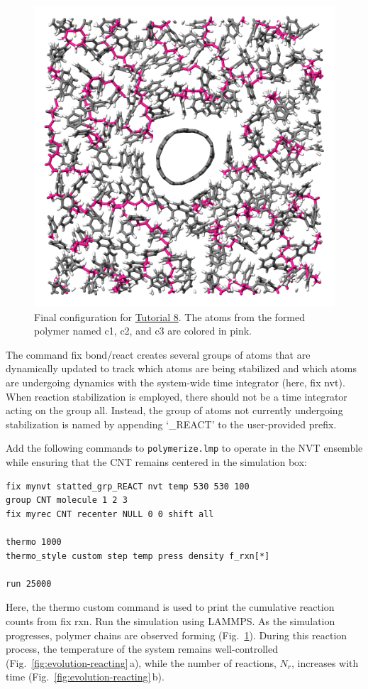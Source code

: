 \documentclass[9pt,tutorial]{livecoms}
\newcommand{\lmpcmd}[1]{\hspace{0pt}\colorbox{listing}{\textcolor{command}{\small{#1}}}\hspace{0pt}} %
\newcommand{\flecmd}[1]{\textcolor{command}{\texttt{#1}}} %
\begin{document}
\begin{figure}
\centering
\includegraphics[width=0.7\linewidth]{REACT-final.png}
\caption{Final configuration for \hyperref[bond-react-label]{Tutorial 8}.
The atoms from the formed polymer named \lmpcmd{c1}, \lmpcmd{c2}, and 
\lmpcmd{c3} are colored in pink.}
\label{fig:REACT-final}
\end{figure}

\begin{note}
The command \lmpcmd{fix bond/react} creates several groups of atoms that are dynamically updated
to track which atoms are being stabilized and which atoms are undergoing
dynamics with the system-wide time integrator (here, \lmpcmd{fix nvt}).
When reaction stabilization is employed, there should not be a time integrator acting on
the group \lmpcmd{all}.  Instead, the group of atoms not currently
undergoing stabilization is named by appending `\_REACT' to the user-provided prefix.
\end{note}

Add the following commands to \flecmd{polymerize.lmp} to operate in the NVT ensemble
while ensuring that the CNT remains centered in the simulation box:
\begin{lstlisting}
fix mynvt statted_grp_REACT nvt temp 530 530 100
group CNT molecule 1 2 3
fix myrec CNT recenter NULL 0 0 shift all

thermo 1000
thermo_style custom step temp press density f_rxn[*]

run 25000
\end{lstlisting}
Here, the \lmpcmd{thermo custom} command is used
to print the cumulative reaction counts from \lmpcmd{fix rxn}.
Run the simulation using LAMMPS.  As the simulation progresses, polymer chains are
observed forming (Fig.~\ref{fig:REACT-final}).  During this reaction process, the
temperature of the system remains well-controlled (Fig.~\ref{fig:evolution-reacting}\,a),
while the number of reactions, $N_r$, increases with time (Fig.~\ref{fig:evolution-reacting}\,b).
\end{document}
